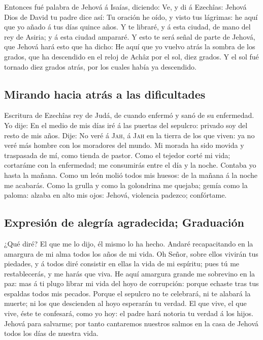  Entonces fué palabra de Jehová á Isaías, diciendo:
 Ve, y di á Ezechîas: Jehová Dios de David tu padre dice
así: Tu oración he oído, y visto tus lágrimas: he aquí que yo añado á
tus días quince años.  Y te libraré, y á esta ciudad, de
mano del rey de Asiria; y á esta ciudad ampararé.  Y esto
te será señal de parte de Jehová, que Jehová hará esto que ha dicho:
 He aquí que yo vuelvo atrás la sombra de los grados, que
ha descendido en el reloj de Achâz por el sol, diez grados. Y el sol fué
tornado diez grados atrás, por los cuales había ya descendido.

\hypertarget{mirando-hacia-atruxe1s-a-las-dificultades}{%
\subsection{Mirando hacia atrás a las
dificultades}\label{mirando-hacia-atruxe1s-a-las-dificultades}}

 Escritura de Ezechîas rey de Judá, de cuando enfermó y
sanó de su enfermedad.  Yo dije: En el medio de mis días
iré á las puertas del sepulcro: privado soy del resto de mis años.
 Dije: No veré á \textsc{Jah}, á \textsc{Jah} en la
tierra de los que viven: ya no veré más hombre con los moradores del
mundo.  Mi morada ha sido movida y traspasada de mí, como
tienda de pastor. Como el tejedor corté mi vida; cortaráme con la
enfermedad; me consumirás entre el día y la noche. 
Contaba yo hasta la mañana. Como un león molió todos mis huesos: de la
mañana á la noche me acabarás.  Como la grulla y como la
golondrina me quejaba; gemía como la paloma: alzaba en alto mis ojos:
Jehová, violencia padezco; confórtame.

\hypertarget{expresiuxf3n-de-alegruxeda-agradecida-graduaciuxf3n}{%
\subsection{Expresión de alegría agradecida;
Graduación}\label{expresiuxf3n-de-alegruxeda-agradecida-graduaciuxf3n}}

 ¿Qué diré? El que me lo dijo, él mismo lo ha hecho.
Andaré recapacitando en la amargura de mi alma todos los años de mi
vida.  Oh Señor, sobre ellos vivirán tus piedades, y á
todos diré consistir en ellas la vida de mi espíritu; pues tú me
restablecerás, y me harás que viva.  He aquí amargura
grande me sobrevino en la paz: mas á ti plugo librar mi vida del hoyo de
corrupción: porque echaste tras tus espaldas todos mis pecados.
 Porque el sepulcro no te celebrará, ni te alabará la
muerte; ni los que descienden al hoyo esperarán tu verdad.
 El que vive, el que vive, éste te confesará, como yo
hoy: el padre hará notoria tu verdad á los hijos.  Jehová
para salvarme; por tanto cantaremos nuestros salmos en la casa de Jehová
todos los días de nuestra vida.

